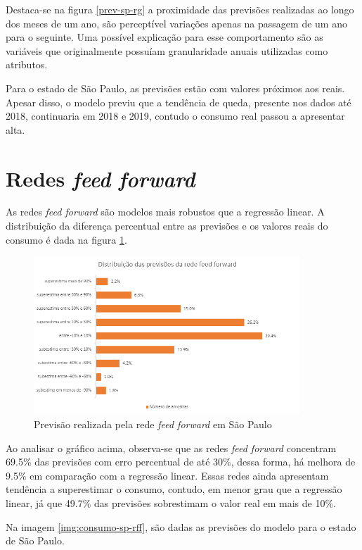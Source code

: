 Destaca-se na figura \ref{prev-sp-rg} a proximidade das previsões realizadas 
ao longo dos meses de um ano, são perceptível variações apenas na passagem de um 
ano para o seguinte. Uma possível explicação para esse comportamento são as 
variáveis que originalmente possuíam granularidade anuais utilizadas como atributos.

Para o estado de São Paulo, as previsões estão com valores próximos aos
reais. Apesar disso, o modelo previu que a tendência de queda, presente
nos dados até 2018, continuaria em 2018 e 2019, contudo o consumo real passou 
a apresentar alta.

\section{Redes \textit{feed forward}}

As redes \textit{feed forward} são modelos mais robustos que a regressão linear.
A distribuição da diferença percentual entre as previsões e os valores reais 
do consumo é dada na figura \ref{img:erro-perc-rff}.

\begin{figure}[H]
    \centering
    \includegraphics[width=10cm]{../figuras/graficos/mlp/erro-perc-mlp.png}
    \caption{Previsão realizada pela rede \textit{feed forward} em São Paulo}
    \label{img:erro-perc-rff}
\end{figure}

Ao analisar o gráfico acima, observa-se que as redes \textit{feed forward}
concentram 69.5\% das previsões com erro percentual de até 30\%, dessa forma, 
há melhora de 9.5\% em comparação com a regressão linear. Essas redes ainda 
apresentam tendência a superestimar o consumo, contudo, em menor grau que 
a regressão linear, já que 49.7\% das previsões sobrestimam  o valor real 
em mais de 10\%.

Na imagem \ref{img:consumo-sp-rff}, são dadas as previsões do modelo para o estado 
de São Paulo.

